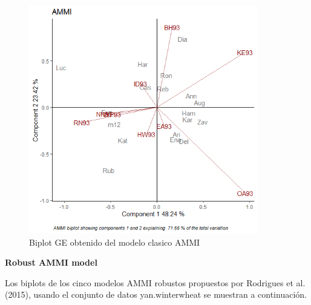 \begin{figure}[h]
	\begin{center}
		\includegraphics[width=10cm]{./Graficos/AMMI.png}
	\end{center}
	\caption{Biplot GE obtenido del modelo clasico AMMI}
\end{figure}

\textbf{Robust AMMI model}

Los biplots de los cinco modelos AMMI robustos propuestos por Rodrigues et al. (2015), usando el conjunto de datos yan.winterwheat se muestran a continuación.

